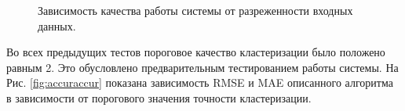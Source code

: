 \documentclass[a4paper, 12pt]{article} %
\begin{document}
	\begin{figure}[h]
	\begin{minipage}[h]{0.49\linewidth}
	\end{minipage}
	\hfill
	\begin{minipage}[h]{0.49\linewidth}
	\end{minipage}
	\caption{Зависимость качества работы системы от разреженности входных данных.}
	\label{fig:accuracy}
	\end{figure}
	\par
	Во всех предыдущих тестов пороговое качество кластеризации было положено равным 2. Это обусловлено предварительным тестированием работы системы. На Рис. \ref{fig:accuraccur} показана зависимость RMSE и MAE описанного алгоритма в зависимости от порогового значения точности кластеризации. 
	
\end{document}
